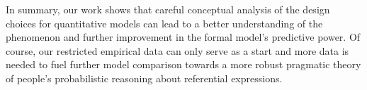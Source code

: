 In summary, our work shows that careful conceptual analysis of the
design choices for quantitative models can lead to a better
understanding of the phenomenon and further improvement in the formal
model's predictive power. Of course, our restricted empirical data can
only serve as a start and more data is needed to fuel further model
comparison towards a more robust pragmatic theory of people's
probabilistic reasoning about referential expressions.

